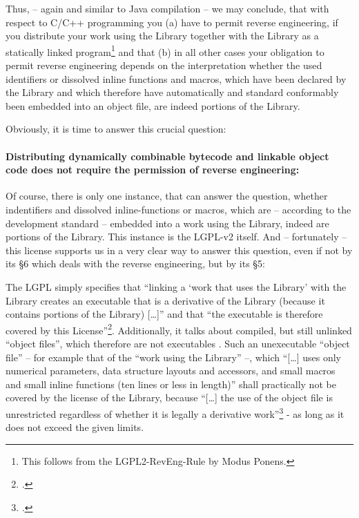 Thus, -- again and similar to Java compilation -- we may conclude, that with
respect to C/C++ programming you (a) have to permit reverse engineering, if you
distribute your work using the Library together with the Library as a statically
linked program\footnote{This follows from the LGPL2-RevEng-Rule by Modus
Ponens.} and that (b) in all other cases your obligation to permit reverse
engineering depends on the interpretation whether the used identifiers or
dissolved inline functions and macros, which have been declared by the Library
and which therefore have automatically and standard conformably been embedded
into an object file, are indeed portions of the Library.

Obviously, it is time to answer this crucial question:
\label{RevEngLgplSection5Derivation}
\paragraph{Distributing dynamically combinable bytecode and linkable object code
does not require the permission of reverse engineering:} 
\label{RevEngDistributeDynamicallyLinkedCode}
Of course, there is only one instance, that can answer the question, whether
indentifiers and dissolved inline-functions or macros, which are -- according to
the development standard -- embedded into a work using the Library, indeed are
portions of the Library. This instance is the LGPL-v2 itself. And -- fortunately
-- this license supports us in a very clear way to answer this question, even if
not by its §6 which deals with the reverse engineering, but by its §5:

The LGPL simply specifies that \enquote{linking a \enquote{work that uses the
Library} with the Library creates an executable that is a derivative of the
Library (because it contains portions of the Library) [\ldots]} and that
\enquote{the executable is therefore covered by this
License}\footcite[cf.][\nopage wp. §5]{Lgpl21OsiLicense1999a}. Additionally, it
talks about compiled, but still unlinked \enquote{object files}, which therefore
are not executables . Such an unexecutable \enquote{object file} -- for example
that of the \enquote{work using the Library} --, which \enquote{[\ldots] uses
only numerical parameters, data structure layouts and accessors, and small
macros and small inline functions (ten lines or less in length)} shall
practically not be covered by the license of the Library, because
\enquote{[\ldots] the use of the object file is unrestricted regardless of
whether it is legally a derivative work}\footcite[cf.][\nopage wp.
§5]{Lgpl21OsiLicense1999a} - as long as it does not exceed the given limits.

